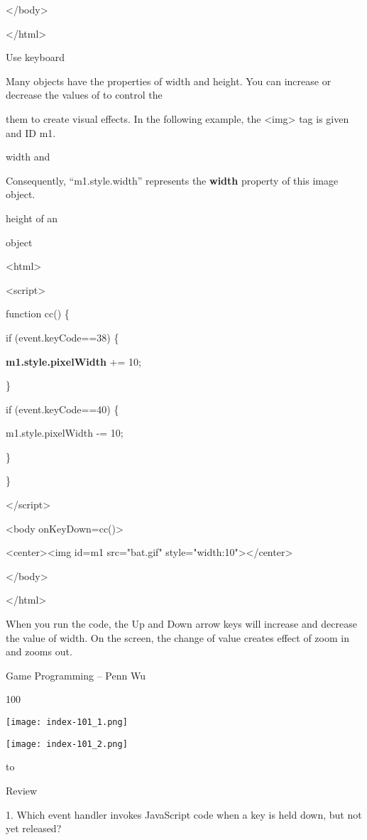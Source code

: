 \documentclass[
]{article}
\begin{document}
\textless/body\textgreater{}

\textless/html\textgreater{}

Use keyboard

Many objects have the properties of width and height. You can increase
or decrease the values of to control the

them to create visual effects. In the following example, the
\textless img\textgreater{} tag is given and ID m1.

width and

Consequently, ``m1.style.width'' represents the \textbf{width} property
of this image object.

height of an

object

\textless html\textgreater{}

\textless script\textgreater{}

function cc() \{

if (event.keyCode==38) \{

\textbf{m1.style.pixelWidth} += 10;

\}

if (event.keyCode==40) \{

m1.style.pixelWidth -= 10;

\}

\}

\textless/script\textgreater{}

\textless body onKeyDown=cc()\textgreater{}

\textless center\textgreater\textless img id=m1 src="bat.gif"
style="width:10"\textgreater\textless/center\textgreater{}

\textless/body\textgreater{}

\textless/html\textgreater{}

When you run the code, the Up and Down arrow keys will increase and
decrease the value of width. On the screen, the change of value creates
effect of zoom in and zooms out.

Game Programming -- Penn Wu

100

\protect\hypertarget{index_split_007.htmlux5cux23p101}{}{}\texttt{[image: index-101\_1.png]}

\texttt{[image: index-101\_2.png]}

to

Review

1. Which event handler invokes JavaScript code when a key is held down,
but not yet released?
\end{document}
